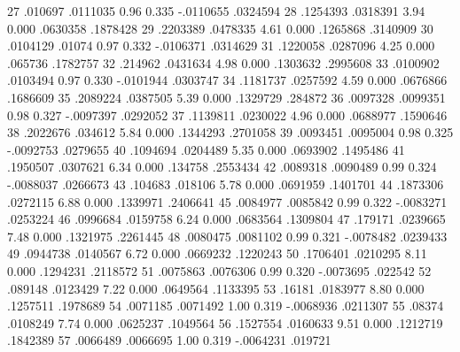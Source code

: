          27  {\VBAR}    .010697   .0111035     0.96   0.335    -.0110655    .0324594
         28  {\VBAR}   .1254393   .0318391     3.94   0.000     .0630358    .1878428
         29  {\VBAR}   .2203389   .0478335     4.61   0.000     .1265868    .3140909
         30  {\VBAR}   .0104129     .01074     0.97   0.332    -.0106371    .0314629
         31  {\VBAR}   .1220058   .0287096     4.25   0.000      .065736    .1782757
         32  {\VBAR}    .214962   .0431634     4.98   0.000     .1303632    .2995608
         33  {\VBAR}   .0100902   .0103494     0.97   0.330    -.0101944    .0303747
         34  {\VBAR}   .1181737   .0257592     4.59   0.000     .0676866    .1686609
         35  {\VBAR}   .2089224   .0387505     5.39   0.000     .1329729     .284872
         36  {\VBAR}   .0097328   .0099351     0.98   0.327    -.0097397    .0292052
         37  {\VBAR}   .1139811   .0230022     4.96   0.000     .0688977    .1590646
         38  {\VBAR}   .2022676    .034612     5.84   0.000     .1344293    .2701058
         39  {\VBAR}   .0093451   .0095004     0.98   0.325    -.0092753    .0279655
         40  {\VBAR}   .1094694   .0204489     5.35   0.000     .0693902    .1495486
         41  {\VBAR}   .1950507   .0307621     6.34   0.000      .134758    .2553434
         42  {\VBAR}   .0089318   .0090489     0.99   0.324    -.0088037    .0266673
         43  {\VBAR}    .104683    .018106     5.78   0.000     .0691959    .1401701
         44  {\VBAR}   .1873306   .0272115     6.88   0.000     .1339971    .2406641
         45  {\VBAR}   .0084977   .0085842     0.99   0.322    -.0083271    .0253224
         46  {\VBAR}   .0996684   .0159758     6.24   0.000     .0683564    .1309804
         47  {\VBAR}    .179171   .0239665     7.48   0.000     .1321975    .2261445
         48  {\VBAR}   .0080475   .0081102     0.99   0.321    -.0078482    .0239433
         49  {\VBAR}   .0944738   .0140567     6.72   0.000     .0669232    .1220243
         50  {\VBAR}   .1706401   .0210295     8.11   0.000     .1294231    .2118572
         51  {\VBAR}   .0075863   .0076306     0.99   0.320    -.0073695     .022542
         52  {\VBAR}    .089148   .0123429     7.22   0.000     .0649564    .1133395
         53  {\VBAR}     .16181   .0183977     8.80   0.000     .1257511    .1978689
         54  {\VBAR}   .0071185   .0071492     1.00   0.319    -.0068936    .0211307
         55  {\VBAR}     .08374   .0108249     7.74   0.000     .0625237    .1049564
         56  {\VBAR}   .1527554   .0160633     9.51   0.000     .1212719    .1842389
         57  {\VBAR}   .0066489   .0066695     1.00   0.319    -.0064231     .019721
